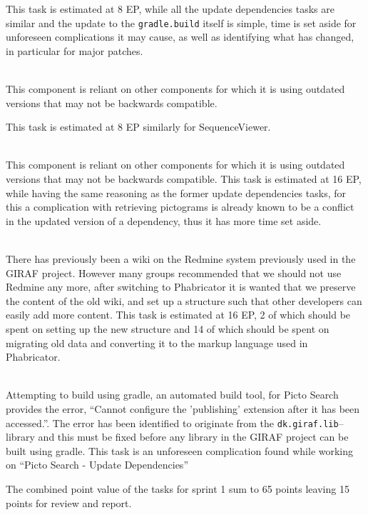 \begin{description}[style=unboxed]
        This task is estimated at 8 EP, while all the update dependencies tasks are similar and the update to the \texttt{gradle.build} itself is simple, time is set aside for unforeseen complications it may cause, as well as identifying what has changed, in particular for major patches.
    \item[{[}\phigh{]} Sequence --- Update dependencies] \hfill \\ 
        This component is reliant on other components for which it is using outdated versions that may not be backwards compatible.

        This task is estimated at 8 EP similarly for SequenceViewer.
    \item[{[}\phigh{]} Picto Search --- Update dependencies] \hfill \\
        This component is reliant on other components for which it is using outdated versions that may not be backwards compatible.
        This task is estimated at 16 EP, while having the same reasoning as the former update dependencies tasks, for this a complication with retrieving pictograms is already known to be a conflict in the updated version of a dependency, thus it has more time set aside.
    \item[{[}\phigh{]} Wiki --- Setup new structure and migrate to Phabricator] \hfill \\
        There has previously been a wiki on the Redmine system previously used in the GIRAF project. 
        However many groups recommended that we should not use Redmine any more, after switching to Phabricator it is wanted that we preserve the content of the old wiki, and set up a structure such that other developers can easily add more content.
        This task is estimated at 16 EP, 2 of which should be spent on setting up the new structure and 14 of which should be spent on migrating old data and converting it to the markup language used in Phabricator. 

    \item[{[}\pblocking{]} Gradle --- Custom plug-in dk.giraf.lib for gradle breaks build] \hfill \\
        Attempting to build using gradle, an automated build tool, for Picto Search provides the error, ``Cannot configure the 'publishing' extension after it has been accessed.''. 
        The error has been identified to originate from the \texttt{dk.giraf.lib}--library and this must be fixed before any library in the GIRAF project can be built using gradle. 
        This task is an unforeseen complication found while working on ``Picto Search - Update Dependencies''
\end{description}
The combined point value of the tasks for sprint 1 sum to 65 points leaving 15 points for review and report.

